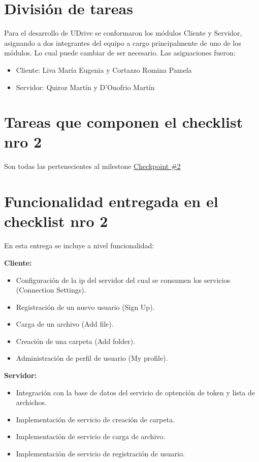 \documentclass[letterpaper,10pt,english]{sphinxmanual}
\begin{document}
\section{División de tareas}
\label{uDriveDoc:division-de-tareas}
Para el desarrollo de UDrive se conformaron los módulos Cliente y Servidor, asignando a dos integrantes del equipo a cargo principalmente de uno de los módulos. Lo cual puede cambiar de ser necesario. Las asignaciones fueron:
\begin{itemize}
\item {} 
Cliente:  Liva María Eugenia y Cortazzo Romina Pamela

\item {} 
Servidor:  Quiroz Martín y D'Onofrio Martín

\end{itemize}


\section{Tareas que componen el checklist nro 2}
\label{uDriveDoc:tareas-que-componen-el-checklist-nro-2}
Son todas las pertenecientes al milestone \href{https://github.com/martineq/tp7552/milestones/Checkpoint\%20\%232}{Checkpoint \#2}


\section{Funcionalidad entregada en el checklist nro 2}
\label{uDriveDoc:funcionalidad-entregada-en-el-checklist-nro-2}
En esta entrega se incluye a nivel funcionalidad:

\textbf{Cliente:}
\begin{itemize}
\item {} 
Configuración de la ip del servidor del cual se consumen los servicios (Connection Settings).

\item {} 
Registración de un nuevo usuario (Sign Up).

\item {} 
Carga de un archivo (Add file).

\item {} 
Creación de una carpeta (Add folder).

\item {} 
Administración de perfil de usuario (My profile).

\end{itemize}

\textbf{Servidor:}
\begin{itemize}
\item {} 
Integración con la base de datos del servicio de optención de token y lista de archichos.

\item {} 
Implementación de servicio de creación de carpeta.

\item {} 
Implementación de servicio de carga de archivo.

\item {} 
Implementación de servicio de registración de usuario.

\end{itemize}
\end{document}
